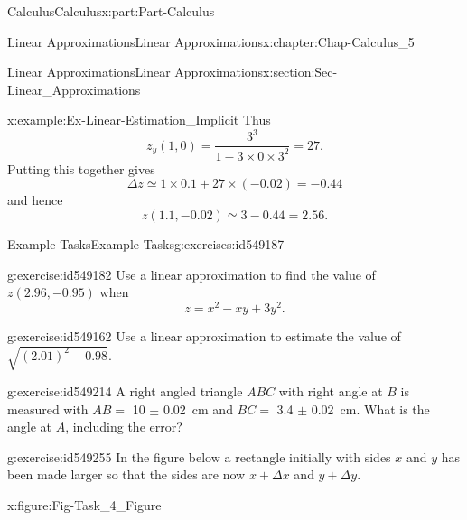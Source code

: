 \documentclass[oneside,10pt,]{book}
\numberwithin{equation}{section}
\begin{document}
\begin{partptx}{Calculus}{}{Calculus}{}{}{x:part:Part-Calculus}
\begin{chapterptx}{Linear Approximations}{}{Linear Approximations}{}{}{x:chapter:Chap-Calculus_5}
\begin{sectionptx}{Linear Approximations}{}{Linear Approximations}{}{}{x:section:Sec-Linear_Approximations}
\begin{example}{}{x:example:Ex-Linear-Estimation_Implicit}
Thus%
\begin{equation*}
z_y(1,0) = \dfrac{3^3}{1-3 \times 0 \times 3^2} = 27\text{.}
\end{equation*}
Putting this together gives%
\begin{equation*}
\Delta z \simeq 1 \times 0.1 + 27 \times (-0.02) = -0.44
\end{equation*}
and hence%
\begin{equation*}
z(1.1,-0.02) \simeq 3-0.44 = 2.56.
\end{equation*}
%
\end{example}
%
%
\typeout{************************************************}
\typeout{************************************************}
%
\begin{exercises-subsection-numberless}{Example Tasks}{}{Example Tasks}{}{}{g:exercises:id549187}
\begin{divisionexercise}{1}{}{}{g:exercise:id549182}%
Use a linear approximation to find the value of \(z(2.96,-0.95)\) when%
\begin{equation*}
z=x^2-xy+3y^2\text{.}
\end{equation*}
%
\end{divisionexercise}%
\begin{divisionexercise}{2}{}{}{g:exercise:id549162}%
Use a linear approximation to estimate the value of \(\sqrt{(2.01)^2-0.98}\).%
\end{divisionexercise}%
\begin{divisionexercise}{3}{}{}{g:exercise:id549214}%
A right angled triangle \(ABC\) with right angle at \(B\) is measured with \(AB = \) 10 \(\pm\) \SI{0.02}{\centi\meter} and \(BC = \) 3.4 \(\pm\) \SI{0.02}{\centi\meter}. What is the angle at \(A\), including the error?%
\end{divisionexercise}%
\begin{divisionexercise}{4}{}{}{g:exercise:id549255}%
In the figure below a rectangle initially with sides \(x\) and \(y\) has been made larger so that the sides are now \(x + \Delta x\) and \(y + \Delta y\). \begin{figureptx}{}{x:figure:Fig-Task_4_Figure}{}%
\begin{image}{0.2}{0.6}{0.2}%

\end{image}
\end{figureptx}
\end{divisionexercise}
\end{exercises-subsection-numberless}
\end{sectionptx}
\end{chapterptx}
\end{partptx}
\end{document}
